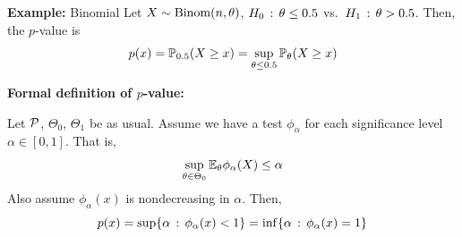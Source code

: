 \begin{example}{\textbf{Example:} Binomial}
    Let $X \sim \Binom(n, \theta)$, $H_0 \col \theta \leq 0.5$ vs.\ $H_1 \col \theta > 0.5$. Then, the $p$-value is
    \[ p(x) = \bb{P}_{0.5}(X \geq x) = \sup_{\theta \leq 0.5} \bb{P}_{\theta}(X \geq x) \]
\end{example}

\textbf{Formal definition of $p$-value:}

\begin{definition}
    Let $\cal{P}$, $\Theta_0$, $\Theta_1$ be as usual. Assume we have a test $\phi_{\alpha}$ for each significance level $\alpha \in [0, 1]$. That is,
    \[ \sup_{\theta \in \Theta_0} \E_{\theta}\phi_{\alpha}(X) \leq \alpha \]
    Also assume $\phi_{\alpha}(x)$ is nondecreasing in $\alpha$. Then,
    \[ p(x) = \sup\{\alpha \col \phi_{\alpha}(x) < 1\} = \inf\{\alpha \col \phi_{\alpha}(x) = 1\} \]
\end{definition}
